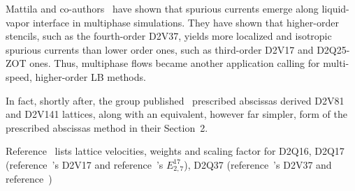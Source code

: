     Mattila  and  co-authors~\cite{2013-MattilaKK+PhilippiPC-IntJModPhysC}  have  shown  that  spurious  currents  emerge  along
    liquid-vapor interface in multiphase simulations. They have shown that  higher-order  stencils,  such  as  the  fourth-order
    D2V37, yields more localized and isotropic spurious currents than lower order ones, such as third-order D2V17 and  D2Q25-ZOT
    ones. Thus, multiphase flows became another application calling for multi-speed, higher-order LB methods.

    In fact, shortly after, the group published~\cite{2014-MattilaKK+PhilippiPC-SciWorldJ} prescribed  abscissas  derived  D2V81
    and D2V141 lattices, along with an equivalent, however far simpler,  form  of  the  prescribed  abscissas  method  in  their
    Section~2.

    Reference~\cite{2014-MengJ+ZhangY-JComputPhys} lists lattice  velocities,  weights  and  scaling  factor  for  D2Q16,  D2Q17
    (reference~\cite{2007-SiebertDN+PhilippiPC-IntJModPhysC}'s D2V17 and reference~\cite{2010-ShanX-PhysRevE}'s $E_{2,7}^{17}$),
    D2Q37 (reference~\cite{2006-PhilippiPC+SurmasR-PhysRevE}'s D2V37 and reference~\cite{})






